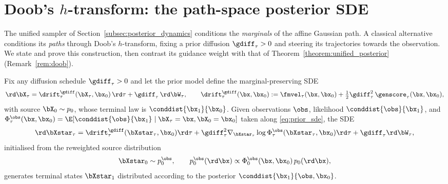 \section{Doob's $h$-transform: the path-space posterior SDE}
\label{appendix:proof_posterior}

The unified sampler of Section~\ref{subsec:posterior_dynamics} conditions the \emph{marginals} of the affine Gaussian path. A classical alternative conditions its \emph{paths} through Doob's $h$-transform, fixing a prior diffusion $\gdiff_\tau>0$ and steering its trajectories towards the observation. We state and prove this construction, then contrast its guidance weight with that of Theorem~\ref{theorem:unified_posterior} (Remark~\ref{rem:doob}).

\begin{theorem}\label{theorem:posterior_sde}
Fix any diffusion schedule $\gdiff_\tau>0$ and let the prior model define the marginal-preserving SDE
\begin{align}\label{eq:prior_sde}
    \rd\bX_\tau = \drift^{\gdiff}_\tau(\bX_\tau,\bx_0)\,\rd\tau + \gdiff_\tau\,\rd\bW_\tau,
    \qquad
    \drift^{\gdiff}_\tau(\bx,\bx_0) := \fmvel_\tau(\bx,\bx_0) + \tfrac12\gdiff_\tau^2\,\genscore_\tau(\bx,\bx_0),
\end{align}
with source $\bX_0\sim p_0$, whose terminal law is $\conddist{\bx_1}{\bx_0}$. Given observations $\obs$, likelihood $\conddist{\obs}{\bx_1}$, and $\Phi_{\tau}^{\obs}(\bx, \bx_0)=\E[\conddist{\obs}{\bx_1} \mid \bX_\tau = \bx, \bX_0 = \bx_0 ]$ taken along \eqref{eq:prior_sde}, the SDE
\begin{align}
    \rd \bXstar_\tau = \drift^{\gdiff}_\tau(\bXstar_{\tau}, \bx_0) \rd \tau + \gdiff_\tau^2
    \nabla_{\bXstar_\tau} \log \Phi_{\tau}^{\obs}(\bXstar_{\tau}, \bx_0) \rd \tau + \gdiff_\tau \rd \bW_\tau,
\end{align}
initialised from the reweighted source distribution
\begin{align}\label{eq:twisted_init}
    \bXstar_0 \sim p_0^{\obs}, \qquad p_0^{\obs}(\rd\bx) \propto \Phi_{0}^{\obs}(\bx, \bx_0)\, p_0(\rd\bx),
\end{align}
generates terminal states $\bXstar_1$ distributed according to the posterior $\conddist{\bx_1}{\obs, \bx_0}$.
\end{theorem}


